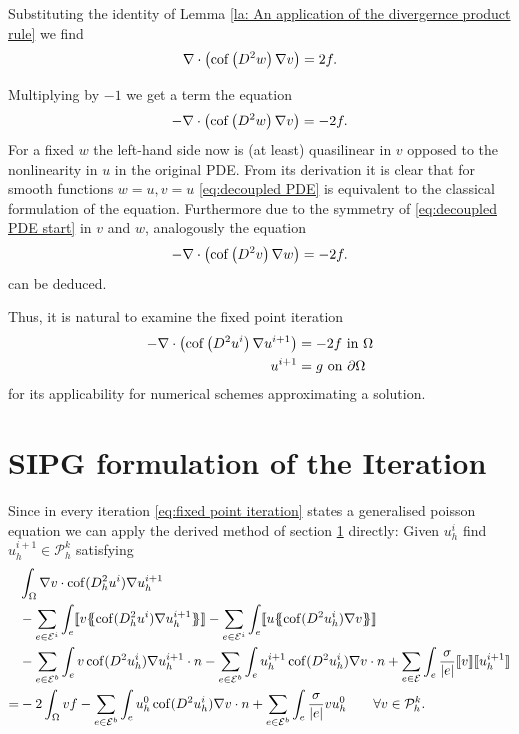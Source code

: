 Substituting the identity of Lemma \ref{la: An application of the divergernce product rule} we find
\begin{align}
	\nabla \cdot \left( \operatorname{cof} \left( D^2 w  \right) \nabla v \right) = 2f.
\end{align}


Multiplying by $-1$ we get a term the equation
\begin{align}
	- \nabla \cdot \left( \operatorname{cof} \left(  D^2 w \right) \nabla v \right)  = -2f.  \label{eq:decoupled PDE}
\end{align}
For a fixed $w$ the left-hand side now is (at least) quasilinear in $v$ opposed to the nonlinearity in $u$ in the original PDE. From its derivation it is clear that for smooth functions $w=u, v=u$ \eqref{eq:decoupled PDE} is equivalent to the classical formulation of the \MA equation. Furthermore due to the symmetry of \eqref{eq:decoupled PDE start} in $v$ and $w$, analogously the equation 
\begin{align}
	- \nabla \cdot \left( \operatorname{cof} \left(  D^2 v \right) \nabla w \right)  = -2f.  \label{eq:decoupled PDE two}
\end{align}
can be deduced.

Thus, it is natural to examine the fixed point iteration
\begin{align}
	\begin{split}
	- \nabla \cdot \left( \operatorname{cof} \left(  D^2 u^i \right) \nabla u^{i+1} \right)  &= -2f  \text{ in } \Omega \\
		u^{i+1} &= g \textnormal{ on } \partial \Omega
	\label{eq:fixed point iteration}
	\end{split}
\end{align}
for its applicability for numerical schemes approximating a \MA solution.

\section{SIPG formulation of the Iteration}\label{sec: SIPG}
Since in every iteration \eqref{eq:fixed point iteration} states a generalised poisson equation we can apply the derived  method of section \ref{sec: SIPG} directly: Given $u^i_h$ find $u^{i+1}_h \in \mathcal P^k_h$ satisfying
\begin{align}
 &\int_{\Omega} \nabla v \cdot \cof(D_h^2 u^{i}) \nabla u_h^{i+1}\\
 & -\sum\limits_{e \in \bigEps^i}\int_{e} \jump {v \average { \cof(D_h^2 u^{i}) \nabla u_h^{i+1}} }
 - \sum\limits_{e \in \bigEps^i}\int_{e} \jump {u \average{ \cof(D^2 u_h^{i}) \nabla v} } \\  
 & - \sum\limits_{e \in \bigEps^b}\int_{e} v \cof(D^2 u_h^{i}) \nabla u_h^{i+1}\cdot n 
    - \sum\limits_{e \in \bigEps^b}\int_{e} u_h^{i+1}\cof(D^2 u_h^{i}) \nabla v \cdot n
    +\sum\limits_{e \in \bigEps} \int_e \frac \sigma {|e|} \jump v  \jump {u_h^{i+1}}\\
    =& - 2 \int_{\Omega}v f
    	 				-\sum\limits_{e \in \bigEps^b}\int_{e} u_h^0 \cof(D^2 u_h^{i}) \nabla v \cdot n 
    	 				+\sum\limits_{e \in \bigEps^b} \int_e \frac \sigma {|e|} v u_h^0    \qquad \forall v \in  \mathcal P^k_h.
    	\label{eq: sipg iteration}
\end{align}


